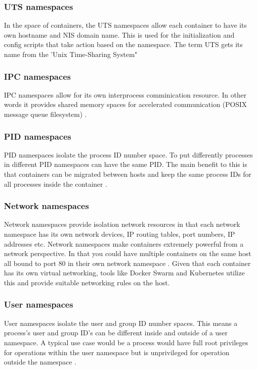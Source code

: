 \subsubsection{UTS namespaces}
In the space of containers, the UTS namespaces allow each container to have its own hostname and NIS domain name. This is used for the initialization and config scripts that take action based on the namespace. The term UTS gets its name from the 'Unix Time-Sharing System" \citep{kerrisk_2013}

\subsubsection{IPC namespaces}
IPC namespaces allow for its own interprocess comminication resource. In other words it provides shared memory spaces for accelerated communication (POSIX message queue filesystem) \citep{kerrisk_2013}.

\subsubsection{PID namespaces}
PID namespaces isolate the process ID number space. To put differently processes in different PID namespaces can have the same PID. The main benefit to this is that containers can be migrated between hosts and keep the same process IDs for all processes inside the container \citep{kerrisk_2013}.

\subsubsection{Network namespaces}
Network namespaces provide isolation network resources in that each network namespace has its own network devices, IP routing tables, port numbers, IP addresses etc. Network namespaces make containers extremely powerful from a network perspective. In that you could have multiple containers on the same host all bound to port 80 in their own network namespace \citep{kerrisk_2013}. Given that each container has its own virtual networking, tools like Docker Swarm and Kubernetes utilize this and provide suitable networking rules on the host.

\subsubsection{User namespaces}
\label{sub:username}
User namespaces isolate the user and group ID number spaces. This means a process's user and group ID's can be different inside and outside of a user namespace. A typical use case would be a process would have full root privileges for operations within the user namespace but is unprivileged for operation outside the namespace \citep{kerrisk_2013}.

